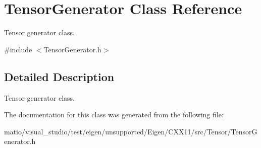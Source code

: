 \hypertarget{class_tensor_generator}{}\section{Tensor\+Generator Class Reference}
\label{class_tensor_generator}


Tensor generator class.  




{\ttfamily \#include $<$Tensor\+Generator.\+h$>$}



\subsection{Detailed Description}
Tensor generator class. 

The documentation for this class was generated from the following file\+:\begin{DoxyCompactItemize}
\item 
matio/visual\+\_\+studio/test/eigen/unsupported/\+Eigen/\+C\+X\+X11/src/\+Tensor/\+Tensor\+Generator.\+h\end{DoxyCompactItemize}
